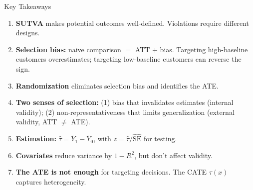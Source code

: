 \documentclass[aspectratio=169, 11pt, handout]{beamer}
\newcommand{\SE}{\mathrm{SE}}
\begin{document}
\begin{frame}{Key Takeaways}

\begin{enumerate}
    \item \textbf{SUTVA} makes potential outcomes well-defined. Violations require different designs.
    
    \medskip
    
    \item \textbf{Selection bias:} naive comparison $=$ ATT $+$ bias. Targeting high-baseline customers overestimates; targeting low-baseline customers can reverse the sign.
    
    \medskip
    
    \item \textbf{Randomization} eliminates selection bias and identifies the ATE.
    
    \medskip
    
    \item \textbf{Two senses of selection:} (1) bias that invalidates estimates (internal validity); (2) non-representativeness that limits generalization (external validity, ATT $\neq$ ATE).
    
    \medskip
    
    \item \textbf{Estimation:} $\hat{\tau} = \bar{Y}_1 - \bar{Y}_0$, with $z = \hat{\tau}/\widehat{\SE}$ for testing.
    
    \medskip
    
    \item \textbf{Covariates} reduce variance by $1 - R^2$, but don't affect validity.
    
    \medskip
    
    \item \textbf{The ATE is not enough} for targeting decisions. The CATE $\tau(x)$ captures heterogeneity.
\end{enumerate}
\end{frame}
\end{document}
